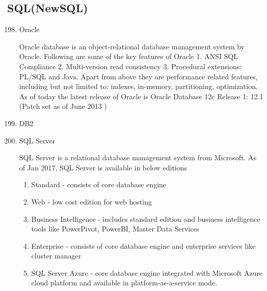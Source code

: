 \subsection{SQL(NewSQL)}
\label{\detokenize{i524/technologies:sql-newsql}}\begin{enumerate}
\setcounter{enumi}{197}
\item {} 
Oracle

Oracle database is an object-relational database management system by
Oracle. Following are some of the key features of Oracle \label{\detokenize{i524/technologies:id365}}{\hyperref[\detokenize{i524/technologies:www-oracle}]{\sphinxcrossref{{[}313{]}}}}
1. ANSI SQL Compliance
2. Multi-version read consistency
3. Procedural extensions: PL/SQL and Java.
Apart from above they are performance related features, including but not
limited to: indexes, in-memory, partitioning, optimization.
As of today the latest release of Oracle is \label{\detokenize{i524/technologies:id366}}{\hyperref[\detokenize{i524/technologies:www-oracle}]{\sphinxcrossref{{[}313{]}}}}
Oracle Database 12c Release 1: 12.1 (Patch set as of June 2013 )

\item {} 
DB2

\item {} 
SQL Server

SQL Server \label{\detokenize{i524/technologies:id367}}{\hyperref[\detokenize{i524/technologies:www-sqlserver-wiki}]{\sphinxcrossref{{[}314{]}}}} is a relational database
management system from Microsoft. As of Jan 2017, SQL Server is
available in below editions
\begin{enumerate}
\item {} 
Standard - consists of core database engine

\item {} 
Web - low cost edition for web hosting

\item {} 
Business Intelligence - includes standard edition and business
intelligence tools like PowerPivot, PowerBI, Master Data Services

\item {} 
Enterprise - consists of core database engine and enterprise services
like cluster manager

\item {} 
SQL Server Azure - \label{\detokenize{i524/technologies:id368}}{\hyperref[\detokenize{i524/technologies:www-azuresql}]{\sphinxcrossref{{[}315{]}}}} core database engine
integrated with Microsoft Azure cloud platform and available in
platform-as-a-service mode.


\end{enumerate}
\end{enumerate}
